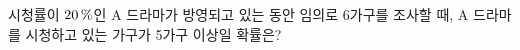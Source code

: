 시청률이 $20\mkern3mu \%$인 $\mathrm{A}$ 드라마가 방영되고 있는 동안 임의로 6가구를 조사할 때, $\mathrm{A}$ 드라마를 시청하고 있는 가구가 5가구 이상일 확률은?
